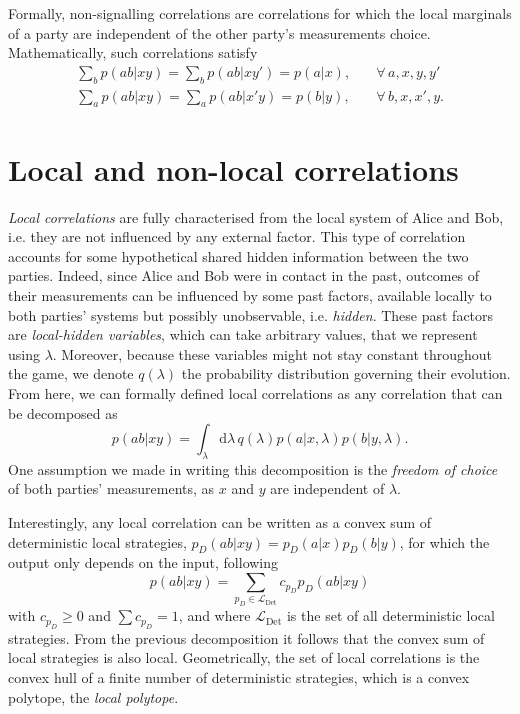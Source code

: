 Formally, non-signalling correlations are correlations for which the local marginals of a party are independent of the other party's measurements choice. 
Mathematically, such correlations satisfy
\begin{align}
	\sum_b p(ab|xy) = \sum_b p(ab|xy') = p(a|x), \quad &\forall\,a,x,y,y' \\
	\sum_a p(ab|xy) = \sum_a p(ab|x'y) = p(b|y), \quad &\forall\,b,x,x',y.
	\label{eq:non-signalling}
\end{align}

\pagebreak 

\section{Local and non-local correlations}

\textit{Local correlations} are fully characterised from the local system of Alice and Bob, i.e. they are not influenced by any external factor.
This type of correlation accounts for some hypothetical shared hidden information between the two parties.
Indeed, since Alice and Bob were in contact in the past, outcomes of their measurements can be influenced by some past factors, available locally to both parties' systems but possibly unobservable, i.e. \textit{hidden}.
These past factors are \textit{local-hidden variables}, which can take arbitrary values, that we represent using $\lambda$.
Moreover, because these variables might not stay constant throughout the game, we denote $q(\lambda)$ the probability distribution governing their evolution. 
From here, we can formally defined local correlations as any correlation that can be decomposed as
\begin{equation}
	p(ab|xy) = \int_\lambda \mathrm{d}\lambda \, q(\lambda) p(a|x,\lambda) p(b|y,\lambda).
	\label{eq:local}
\end{equation}
One assumption we made in writing this decomposition is the \textit{freedom of choice} of both parties' measurements, as $x$ and $y$ are independent of $\lambda$.

Interestingly, any local correlation can be written as a convex sum of deterministic local strategies, $p_D(ab|xy)=p_D(a|x)p_D(b|y)$, for which the output only depends on the input, following
\begin{equation}
	p(ab|xy) = \sum_{p_D \in \mathcal{L}_\text{Det}} c_{p_D} p_D(ab|xy)
	\label{eq:polytope}
\end{equation}
with $c_{p_D}\geq 0$ and $\sum c_{p_D} = 1$, and where $\mathcal{L}_\text{Det}$ is the set of all deterministic local strategies.
From the previous decomposition it follows that the convex sum of local strategies is also local. 
Geometrically, the set of local correlations is the convex hull of a finite number of deterministic strategies, which is a convex polytope, the \textit{local polytope}.

